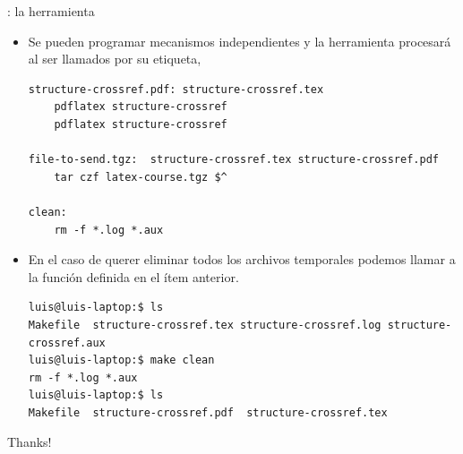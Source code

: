 \documentclass{beamer}
\begin{document}
\begin{frame}[fragile]{\insertsection: la herramienta }
  \begin{itemize}
    \item Se pueden programar mecanismos independientes y la
      herramienta procesará al ser llamados por su etiqueta,
    \begin{center}
      \begin{verbatim}
structure-crossref.pdf: structure-crossref.tex
	pdflatex structure-crossref
	pdflatex structure-crossref

file-to-send.tgz:  structure-crossref.tex structure-crossref.pdf
	tar czf latex-course.tgz $^

clean:
	rm -f *.log *.aux 
      \end{verbatim}
    \end{center}
  \item En el caso de querer eliminar todos los archivos temporales
    podemos llamar a la función  definida en el ítem
    anterior.
    \begin{center}
      \begin{verbatim}
luis@luis-laptop:$ ls
Makefile  structure-crossref.tex structure-crossref.log structure-crossref.aux
luis@luis-laptop:$ make clean
rm -f *.log *.aux 
luis@luis-laptop:$ ls
Makefile  structure-crossref.pdf  structure-crossref.tex
      \end{verbatim}
    \end{center}
  \end{itemize}
\end{frame}


\begin{frame}
  \begin{center}
    Thanks!
  \end{center}
\end{frame}
\end{document}

